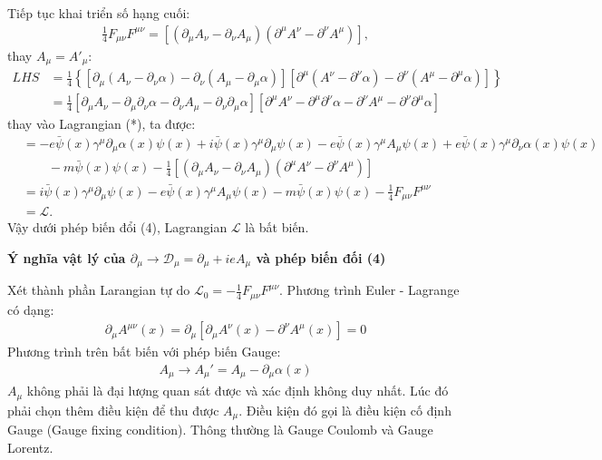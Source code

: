 \documentclass{article}
\begin{document}
Tiếp tục khai triển số hạng cuối:
\begin{align*}
	\frac{1}{4}F_{\mu\nu}F^{\mu\nu} = \left[ (\partial_\mu A_{\nu} - \partial_\nu A_{\mu} ) (\partial^\mu A^{\nu} - \partial^\nu A^{\mu} ) \right],
\end{align*}
thay $A_\mu = A'_\mu$:
\begin{align*}
	LHS
	 & =\frac{1}{4}\left\{\left[\partial_\mu(A_\nu-\partial_\nu\alpha)-\partial_\nu(A_\mu-\partial_\mu\alpha)\right]\left[\partial^\mu(A^\nu-\partial^\nu\alpha)-\partial^\nu(A^\mu-\partial^\mu\alpha)\right]\right\}                                            \\
	 & = \frac{1}{4}\left[\partial_\mu A_\nu - \partial_\mu\partial_\nu\alpha - \partial_\nu A_\mu - \partial_\nu \partial_\mu\alpha\right]\left[\partial^\mu A^\nu - \partial^\mu\partial^\nu\alpha - \partial^\nu A^\mu - \partial^\nu\partial^\mu\alpha\right]
\end{align*}
thay vào Lagrangian (*), ta được:
\begin{align*}
	 & =-e\bar{\psi}(x)\gamma^\mu\partial_\mu\alpha(x)\psi(x)+i\bar{\psi}(x)\gamma^\mu\partial_\mu\psi(x)-e\bar{\psi}(x)\gamma^\mu A_\mu \psi(x)+e\bar{\psi}(x)\gamma^\mu\partial_\nu\alpha(x)\psi(x) \\
	 & \qquad-m\bar{\psi}(x)\psi(x)-\frac{1}{4}\left[\left(\partial_\mu A_\nu-\partial_\nu A_\mu\right)\left(\partial^\mu A^\nu-\partial^\nu A^\mu\right)\right]                                      \\
	 & =i\bar{\psi}(x)\gamma^\mu\partial_\mu\psi(x)-e\bar{\psi}(x)\gamma^\mu A_\mu \psi(x) -m\bar{\psi}(x)\psi(x)-\frac{1}{4}F_{\mu\nu}F^{\mu\nu}                                                     \\
	 & =\mathcal{L}.
\end{align*}
Vậy dưới phép biến đổi (4), Lagrangian $\mathcal{L}$ là bất biến.

\textbf{Ý nghĩa vật lý của $\partial_\mu \rightarrow \mathcal{D}_\mu=\partial_\mu+ieA_\mu $ và phép biến đối (4)}

Xét thành phần Larangian tự do $\mathcal{L}_0 = -\frac{1}{4}F_{\mu\nu}F^{\mu\nu}$. Phương trình Euler - Lagrange có dạng:
\begin{align*}
	\partial_\mu A^{\mu\nu} (x) = 	\partial_\mu \left[ \partial_\mu A^{\nu}(x) - \partial^\nu A^{\mu}(x) \right] = 0
\end{align*}
Phương trình trên bất biến với phép biến Gauge:
\begin{align*}
	A_\mu          \rightarrow A_\mu'=A_\mu-\partial_\mu\alpha(x)
\end{align*}
$A_\mu$ không phải là đại lượng quan sát được và xác định không duy nhất. Lúc đó phải chọn thêm điều kiện để thu được $A_\mu$. Điều kiện đó gọi là điều kiện cố định Gauge (Gauge fixing condition). Thông thường là Gauge Coulomb và Gauge Lorentz.
\end{document}
